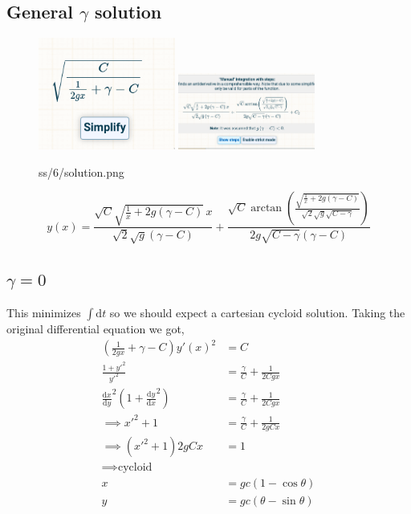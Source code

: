 \documentclass[10pts, letterpaper]{article}
\begin{document}
\subsection*{General $\gamma$ solution} 
\begin{figure}[H]
	\centering
	\includegraphics[width=0.4\textwidth]{ss/6/integral.png}
	\includegraphics[width=0.4\textwidth]{ss/6/solution.png}
	\caption{ss/6/solution.png}
	\label{fig:ss-6-solution-png}
\end{figure}
\[ y(x) = 
\frac{\sqrt{C} \sqrt{\frac{1}{x} + 2g \left({\gamma} - C\right)} \, x}{\sqrt{2} \sqrt{g} \left({\gamma} - C\right)} + \frac{\sqrt{C} \arctan\left(\frac{\sqrt{\frac{1}{x} + 2g \left({\gamma} - C\right)}}{\sqrt{2} \sqrt{g} \sqrt{C - {\gamma}}}\right)}{2g \sqrt{C - {\gamma}} \left({\gamma} - C\right)}
\] 
\subsection*{$\gamma = 0$} 
This minimizes $\int \mathrm{d} t$ so we should expect a cartesian cycloid solution. 
Taking the original differential equation we got, 
\begin{align*}
	\left(
\frac{1}{2g x} + \gamma - C
	\right) y'(x)^2 &=  C \\ 
	\frac{1 + y'^2}{y'^2}  &= \frac{\gamma}{C} + \frac{1}{2 Cg x } \\ 
	\frac{\mathrm{d} x}{\mathrm{d} y}^2 \left(
	1 + \frac{\mathrm{d} y}{\mathrm{d} x}^2\right) &= \frac{\gamma}{C} + \frac{1}{2 C g x} \\ 
	\implies 
	x'^2 + 1 &= \frac{\gamma}{C} + \frac{1}{2 g C x}  \\
	\implies 
	(x'^2 + 1) 2gC x &= 1 \\
	\implies
	\text{cycloid} \\
	x &= gc(1 - \cos \theta) \\
	y &= gc(\theta - \sin \theta) \\
\end{align*}
\end{document}
